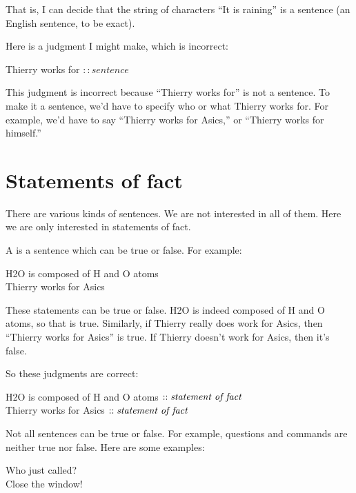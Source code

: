 \documentclass[../../../main.tex]{subfiles}
\begin{document}
\noindent
That is, I can decide that the string of characters ``It is raining'' is a sentence (an English sentence, to be exact).

Here is a judgment I might make, which is incorrect:

\begin{center}
  Thierry works for $:: sentence$
\end{center}

\noindent
This judgment is incorrect because ``Thierry works for'' is not a sentence. To make it a sentence, we'd have to specify who or what Thierry works for. For example, we'd have to say ``Thierry works for Asics,'' or ``Thierry works for himself.''


\section{Statements of fact}

There are various kinds of sentences. We are not interested in all of them. Here we are only interested in statements of fact. 

A  is a sentence which can be true or false. For example:

\begin{center}
  H2O is composed of H and O atoms \\
  Thierry works for Asics
\end{center}

\noindent
These statements can be true or false. H2O is indeed composed of H and O atoms, so that is true. Similarly, if Thierry really does work for Asics, then ``Thierry works for Asics'' is true. If Thierry doesn't work for Asics, then it's false. 

So these judgments are correct:

\begin{center}
  H2O is composed of H and O atoms $:: \text{\emph{statement~of~fact}}$ \\
  Thierry works for Asics $:: \text{\emph{statement~of~fact}}$
\end{center}

\noindent
Not all sentences can be true or false. For example, questions and commands are neither true nor false. Here are some examples:

\begin{center}
  Who just called? \\
  Close the window!
\end{center}
\end{document}
